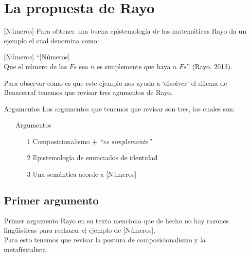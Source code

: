 \documentclass{beamer}
\begin{document}
    \section{La propuesta de Rayo}
      \begin{frame}{[Números]}
        \noindent Para obtener una buena epistemología de las 
        matemáticas Rayo da un ejemplo el cual denomina como:
        \begin{block}{[Números]}
            \pause ``[Números] \\ 
            Que el número de las $Fs$ sea $n$ es simplemente 
            que haya $n$ $Fs$'' (Rayo, 2013). \pause
        \end{block}
        Para observar como es que este ejemplo nos ayuda a `disolver' el 
        dilema de Benacerraf tenemos que revisar tres agumentos de Rayo. 
      \end{frame}
      \begin{frame}{Argumentos}
        Los argumentos que tenemos que revisar son tres, los cuales 
        son: \pause
        \begin{itemize}
            \item [] 
            \begin{block}{Argumentos}
                \begin{itemize}
                    \item [1] Composicionalismo + \textit{``es simplemente''} 
                    \pause 
                    \item [2] Epistemología de enunciados de identidad \pause
                    \item [3] Una semántica acorde a [Números] 
                \end{itemize}
            \end{block}
        \end{itemize}
      \end{frame}

      \subsection{Primer argumento}
      \begin{frame}{Primer argumento}
        Rayo en su texto menciona que de hecho no hay 
        razones lingüisticas para rechazar el ejemplo de [Números].
        \vspace{5pt} \pause \\
        Para esto tenemos que revisar la postura de composicionalismo 
        y la metafísicalista.
      \end{frame}
\end{document}
